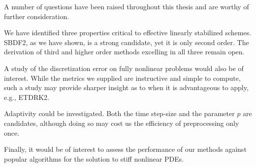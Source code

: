 A number of questions have been raised throughout this thesis and are worthy of further consideration. 

We have identified three properties critical to effective linearly stabilized schemes. SBDF2, as we have shown, is a strong candidate, yet it is only second order. The derivation of third and higher order methods excelling in all three remain open.

A study of the discretization error on fully nonlinear problems would also be of interest. While the metrics we supplied are instructive and simple to compute, such a study may provide sharper insight as to when it is advantageous to apply, e.g., ETDRK2. 

Adaptivity could be investigated. Both the time step-size and the parameter $p$ are candidates, although doing so may cost us the efficiency of preprocessing only once. 

Finally, it would be of interest to assess the performance of our methods against popular algorithms for the solution to stiff nonlinear PDEs. 
